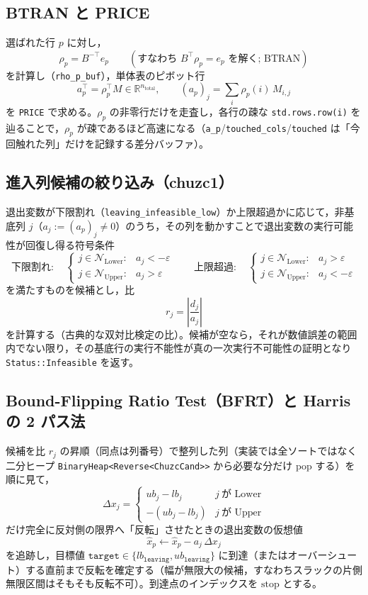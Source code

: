 \documentclass[11pt,a4paper]{ltjsarticle}
\newcommand{\R}{\mathbb{R}}
\newcommand{\code}[1]{\texttt{#1}}
\begin{document}
\subsection{BTRAN と PRICE}

選ばれた行 $p$ に対し，
\[
  \rho_p = B^{-\top} e_p \qquad (\text{すなわち } B^\top \rho_p = e_p \text{ を解く; BTRAN})
\]
を計算し（\code{rho\_p\_buf}），単体表のピボット行
\[
  a_p^\top = \rho_p^\top M \in \R^{n_{\mathrm{total}}}, \qquad (a_p)_j = \sum_i \rho_p(i)\, M_{i,j}
\]
を \code{PRICE} で求める。$\rho_p$ の非零行だけを走査し，各行の疎な \code{std.rows.row(i)} を辿ることで，$\rho_p$ が疎であるほど高速になる（\code{a\_p}/\code{touched\_cols}/\code{touched} は「今回触れた列」だけを記録する差分バッファ）。

\subsection{進入列候補の絞り込み（chuzc1）}

退出変数が下限割れ（\code{leaving\_infeasible\_low}）か上限超過かに応じて，非基底列 $j$（$a_j := (a_p)_j \ne 0$）のうち，その列を動かすことで退出変数の実行可能性が回復し得る符号条件
\[
\text{下限割れ}:\quad
\begin{cases}
  j \in \mathcal N_{\mathrm{Lower}}: & a_j < -\varepsilon\\
  j \in \mathcal N_{\mathrm{Upper}}: & a_j > \varepsilon
\end{cases}
\qquad
\text{上限超過}:\quad
\begin{cases}
  j \in \mathcal N_{\mathrm{Lower}}: & a_j > \varepsilon\\
  j \in \mathcal N_{\mathrm{Upper}}: & a_j < -\varepsilon
\end{cases}
\]
を満たすものを候補とし，比
\[
  r_j = \left|\frac{d_j}{a_j}\right|
\]
を計算する（古典的な双対比検定の比）。候補が空なら，それが数値誤差の範囲内でない限り，その基底行の実行不能性が真の一次実行不可能性の証明となり \code{Status::Infeasible} を返す。

\subsection{Bound-Flipping Ratio Test（BFRT）と Harris の 2 パス法}

候補を比 $r_j$ の昇順（同点は列番号）で整列した列（実装では全ソートではなく二分ヒープ \code{BinaryHeap<Reverse<ChuzcCand>>} から必要な分だけ pop する）を順に見て，
\[
  \Delta x_j = \begin{cases} ub_j-lb_j & j\ \text{が Lower}\\ -(ub_j-lb_j) & j\ \text{が Upper}\end{cases}
\]
だけ完全に反対側の限界へ「反転」させたときの退出変数の仮想値
\[
  \hat x_p \leftarrow \hat x_p - a_j\, \Delta x_j
\]
を追跡し，目標値 $\code{target} \in \{lb_{\code{leaving}}, ub_{\code{leaving}}\}$ に到達（またはオーバーシュート）する直前まで反転を確定する（幅が無限大の候補，すなわちスラックの片側無限区間はそもそも反転不可）。到達点のインデックスを $\mathrm{stop}$ とする。
\end{document}
